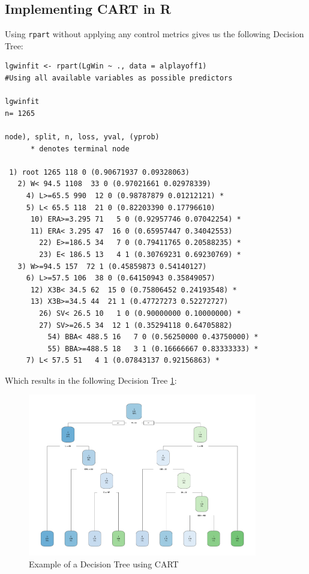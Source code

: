 \documentclass[11pt,a4paper]{report}
\begin{document}
\subsection{Implementing CART in R}
Using {\color{blue} \texttt{rpart}} without applying any control metrics gives us the following Decision Tree:
\begin{verbatim}
lgwinfit <- rpart(LgWin ~ ., data = alplayoff1)
#Using all available variables as possible predictors

lgwinfit
n= 1265 

node), split, n, loss, yval, (yprob)
      * denotes terminal node

 1) root 1265 118 0 (0.90671937 0.09328063)  
   2) W< 94.5 1108  33 0 (0.97021661 0.02978339)  
     4) L>=65.5 990  12 0 (0.98787879 0.01212121) *
     5) L< 65.5 118  21 0 (0.82203390 0.17796610)  
      10) ERA>=3.295 71   5 0 (0.92957746 0.07042254) *
      11) ERA< 3.295 47  16 0 (0.65957447 0.34042553)  
        22) E>=186.5 34   7 0 (0.79411765 0.20588235) *
        23) E< 186.5 13   4 1 (0.30769231 0.69230769) *
   3) W>=94.5 157  72 1 (0.45859873 0.54140127)  
     6) L>=57.5 106  38 0 (0.64150943 0.35849057)  
      12) X3B< 34.5 62  15 0 (0.75806452 0.24193548) *
      13) X3B>=34.5 44  21 1 (0.47727273 0.52272727)  
        26) SV< 26.5 10   1 0 (0.90000000 0.10000000) *
        27) SV>=26.5 34  12 1 (0.35294118 0.64705882)  
          54) BBA< 488.5 16   7 0 (0.56250000 0.43750000) *
          55) BBA>=488.5 18   3 1 (0.16666667 0.83333333) *
     7) L< 57.5 51   4 1 (0.07843137 0.92156863) *
\end{verbatim}
Which results in the following Decision Tree \ref{fig:classtreeex}:
\begin{figure}
    \centering
    \includegraphics[width=10cm]{finalplots/classtree.pdf}
    \caption{Example of a Decision Tree using CART}
    \label{fig:classtreeex}
\end{figure}
\end{document}
